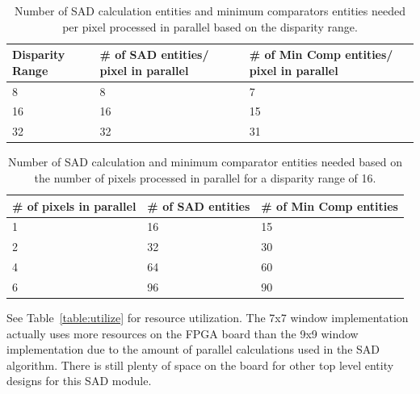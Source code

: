 \begin{table}
\begin{center}
	\begin{tabular}{| p{2cm} | p{4cm} | p{5cm} |}
		\hline 
		\rowstyle{\bfseries} Disparity Range & 
		\rowstyle{\bfseries} \# of SAD entities/ pixel in parallel &
		\rowstyle{\bfseries} \# of Min Comp entities/ pixel in parallel
		\\ \hline
		8 & 8 & 7
		\\ \hline 
		\rowstyle{\bfseries} 16 & 
		\rowstyle{\bfseries} 16 & 
		\rowstyle{\bfseries} 15
		\\ \hline
		32 & 32 & 31
		\\ \hline 
	\end{tabular}
	\captionfonts
	\caption{Number of SAD calculation entities and minimum comparators entities needed per pixel processed in parallel based on the disparity range.}
	\label{table:dispRange}
\end{center}
\end{table}

\begin{table}
\begin{center}
	\begin{tabular}{| p{3cm} | p{3cm} | p{3cm} |}
		\hline 
		\rowstyle{\bfseries} \# of pixels in parallel & 
		\rowstyle{\bfseries} \# of SAD entities &
		\rowstyle{\bfseries} \# of Min Comp entities 
		\\ \hline
		1 & 16 & 15
		\\ \hline 
		\rowstyle{\bfseries} 2 & 
		\rowstyle{\bfseries} 32 & 
		\rowstyle{\bfseries} 30
		\\ \hline 
		\rowstyle{\bfseries} 4 & 
		\rowstyle{\bfseries} 64 & 
		\rowstyle{\bfseries} 60
		\\ \hline
		6 & 96 & 90
		\\ \hline 
	\end{tabular}
	\captionfonts
	\caption{Number of SAD calculation and minimum comparator entities needed based on the number of pixels processed in parallel for a disparity range of 16.}
	\label{table:pixelInParallel}
\end{center}
\end{table}

See Table~\ref{table:utilize} for resource utilization. The 7x7 window implementation actually uses more resources on the FPGA board than the 9x9 window implementation due to the amount of parallel calculations used in the SAD algorithm. There is still plenty of space on the board for other top level entity designs for this SAD module.

